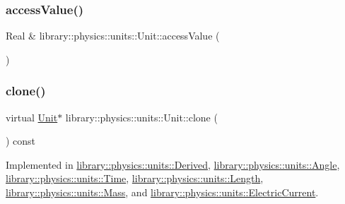 \subsubsection{\texorpdfstring{access\+Value()}{accessValue()}\hspace{0.1cm}{\footnotesize\ttfamily [2/2]}}
{\footnotesize\ttfamily Real \& library\+::physics\+::units\+::\+Unit\+::access\+Value (\begin{DoxyParamCaption}{ }\end{DoxyParamCaption})}

\mbox{\label{classlibrary_1_1physics_1_1units_1_1_unit_aff727141d73acddfae382e5e375f4640}} 
\subsubsection{\texorpdfstring{clone()}{clone()}}
{\footnotesize\ttfamily virtual \hyperlink{classlibrary_1_1physics_1_1units_1_1_unit}{Unit}$\ast$ library\+::physics\+::units\+::\+Unit\+::clone (\begin{DoxyParamCaption}{ }\end{DoxyParamCaption}) const\hspace{0.3cm}{\ttfamily [pure virtual]}}



Implemented in \hyperlink{classlibrary_1_1physics_1_1units_1_1_derived_a6328e9f5bcf35f1c587c20f9c3fdb497}{library\+::physics\+::units\+::\+Derived}, \hyperlink{classlibrary_1_1physics_1_1units_1_1_angle_add51af263128e384d3d89827d0f70dcf}{library\+::physics\+::units\+::\+Angle}, \hyperlink{classlibrary_1_1physics_1_1units_1_1_time_a8745ebee6707751e91137c3e87782b59}{library\+::physics\+::units\+::\+Time}, \hyperlink{classlibrary_1_1physics_1_1units_1_1_length_ae06162cf9f3d140a3b53e156a4cb3309}{library\+::physics\+::units\+::\+Length}, \hyperlink{classlibrary_1_1physics_1_1units_1_1_mass_a7a09438b05edbe4b21a05ec234a6372f}{library\+::physics\+::units\+::\+Mass}, and \hyperlink{classlibrary_1_1physics_1_1units_1_1_electric_current_a3bde9c5bfa0834e43428a28c7059e32f}{library\+::physics\+::units\+::\+Electric\+Current}.

\mbox{\label{classlibrary_1_1physics_1_1units_1_1_unit_a4f4e6ba62e833324970a06c29685488a}} 
